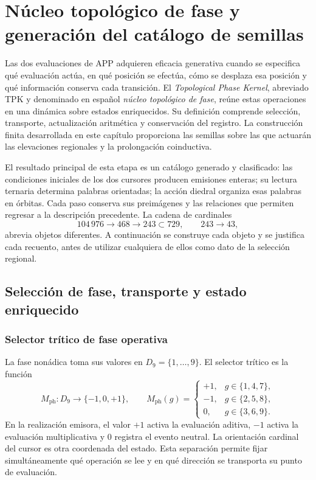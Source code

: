 \section{Núcleo topológico de fase y generación del catálogo de semillas}
\label{act21:tpk:capitulo}

Las dos evaluaciones de APP adquieren eficacia generativa cuando se especifica
qué evaluación actúa, en qué posición se efectúa, cómo se desplaza esa posición
y qué información conserva cada transición. El \emph{Topological Phase Kernel},
abreviado TPK y denominado en español \emph{núcleo topológico de fase}, reúne
estas operaciones en una dinámica sobre estados enriquecidos. Su definición
comprende selección, transporte, actualización aritmética y conservación del
registro. La construcción finita desarrollada en este capítulo proporciona
las semillas sobre las que actuarán las elevaciones regionales y la prolongación
coinductiva.

El resultado principal de esta etapa es un catálogo generado y clasificado:
las condiciones iniciales de los dos cursores producen emisiones enteras;
su lectura ternaria determina palabras orientadas; la acción diedral organiza
esas palabras en órbitas. Cada paso conserva sus preimágenes y las relaciones
que permiten regresar a la descripción precedente. La cadena de cardinales
\[
 104\,976\longrightarrow468\longrightarrow243\subset729,
 \qquad 243\longrightarrow43,
\]
abrevia objetos diferentes. A continuación se construye cada objeto y se
justifica cada recuento, antes de utilizar cualquiera de ellos como dato de
la selección regional.

\subsection{Selección de fase, transporte y estado enriquecido}
\label{act21:tpk:operaciones}

\subsubsection{Selector trítico de fase operativa}

La fase nonádica toma sus valores en \(D_9=\{1,\ldots,9\}\). El selector
trítico es la función
\begin{equation}
 M_{\mathrm{ph}}:D_9\longrightarrow\{-1,0,+1\},\qquad
 M_{\mathrm{ph}}(g)=
 \begin{cases}
 +1,&g\in\{1,4,7\},\\
 -1,&g\in\{2,5,8\},\\
 0,&g\in\{3,6,9\}.
 \end{cases}
 \label{act21:tpk:selector}
\end{equation}
En la realización emisora, el valor \(+1\) activa la evaluación aditiva,
\(-1\) activa la evaluación multiplicativa y \(0\) registra el evento
neutral. La orientación cardinal del cursor es otra coordenada del estado.
Esta separación permite fijar simultáneamente qué operación se lee y en qué
dirección se transporta su punto de evaluación.

